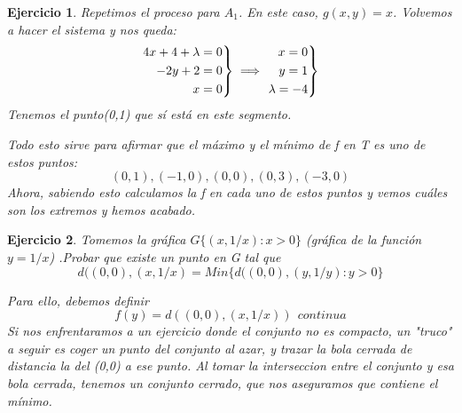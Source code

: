 \documentclass[11pt, a4paper, titlepage]{article}
\theoremstyle{exercise-style}
\newtheorem*{ejer}{Ejercicio}
\theoremstyle{theorem-style}
\newenvironment{rcases}
  {\left.\begin{aligned}}
  {\end{aligned}\right\rbrace}
\begin{document}
\begin{ejer}
	Repetimos el proceso para $A_1$. En este caso, $g(x,y) = x$. Volvemos a hacer el sistema y nos queda:
	\[
	\begin{rcases}
	4x +4 +\lambda = 0\\
	-2y +2  = 0\\
	 x = 0
\end{rcases}\implies \begin{rcases}
	x=0\\
	y = 1\\
	\lambda = -4
\end{rcases}
	\]
	Tenemos el punto(0,1) que sí está en este segmento.
	
	 Todo esto sirve para afirmar que el máximo y el mínimo de f en T es uno de estos puntos:
	\[
	(0,1),(-1,0),(0,0),(0,3),(-3,0)
	\]
	Ahora, sabiendo esto calculamos la f en cada uno de estos puntos y vemos cuáles son los extremos y hemos acabado.
	
	
\end{ejer}


\begin{ejer}
	Tomemos la gráfica  $G\{(x,1/x): x > 0\}$ (gráfica de la función $y= 1/x$) .Probar que existe un punto en G tal que 
\[
d((0,0),(x,1/x) = Min\{d((0,0),(y,1/y) : y > 0\}
\]

Para ello, debemos definir
\[
f(y) = d((0,0),(x,1/x)) \ \ continua
\]
Si nos enfrentaramos a un ejercicio donde el conjunto no es compacto, un "truco" a seguir es coger un punto del conjunto al azar, y trazar la bola cerrada de distancia la del (0,0) a ese punto. Al tomar la interseccion entre el conjunto y esa bola cerrada, tenemos un conjunto cerrado, que nos aseguramos que contiene el mínimo.
\end{ejer}
\end{document}
